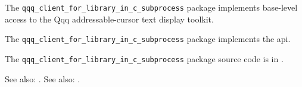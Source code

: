 
The {\tt qqq\_client\_for\_library\_in\_c\_subprocess} package implements base-level access to the Qqq addressable-cursor 
text display toolkit.

The {\tt qqq\_client\_for\_library\_in\_c\_subprocess} package implements the  api.

The {\tt qqq\_client\_for\_library\_in\_c\_subprocess} package source code is in .

See also:  .
See also:  .


